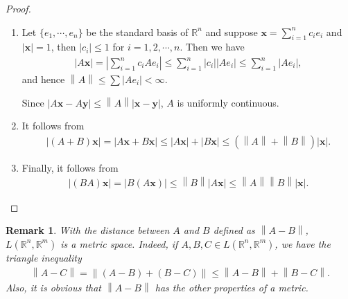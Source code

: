 \documentclass[10pt]{book}
\newtheorem{remark}{Remark}[chapter]
\theoremstyle{definition}
\numberwithin{equation}{chapter}
\begin{document}
\begin{proof}
~\begin{enumerate}[label=(\alph*)]
    \item Let $\{e_1, \cdots, e_n\}$ be the standard basis of $\mathbb{R}^n$ and suppose $\mathbf{x} = \sum^n_{i=1} c_i e_i$ and $\left|\mathbf{x}\right| = 1$, then $\left|c_i\right| \leq 1$ for $i = 1,2,\cdots,n$. Then we have
    \begin{align*}
        \left|A\mathbf{x}\right| = \left|\sum^n_{i=1} c_i Ae_i\right| \leq \sum^n_{i=1} \left|c_i\right| \left|A e_i\right| \leq \sum^n_{i=1} \left|A e_i\right|,
    \end{align*}
    and hence $\left\|A\right\| \leq \sum \left|A e_i\right| < \infty$. 
    
    Since $\left|A\mathbf{x} - A\mathbf{y}\right| \leq \left\|A\right\| \left|\mathbf{x} - \mathbf{y}\right|$, $A$ is uniformly continuous.
    
    \item It follows from
    \begin{align*}
        \left|(A+B)\mathbf{x}\right| = \left|A\mathbf{x} + B\mathbf{x}\right| \leq \left|A\mathbf{x}\right| + \left|B\mathbf{x}\right| \leq \left(\left\|A\right\| + \left\|B\right\|\right) \left|\mathbf{x}\right|.
    \end{align*}
    
    \item Finally, it follows from
    \begin{align*}
        \left|(BA)\mathbf{x}\right| = \left|B(A\mathbf{x})\right| \leq \left\|B\right\| \left|A\mathbf{x}\right| \leq \left\|A\right\| \left\|B\right\| \left|\mathbf{x}\right|.
    \end{align*}
\end{enumerate}
\end{proof}

\begin{remark}
With the distance between $A$ and $B$ defined as $\left\|A - B\right\|$, $L(\mathbb{R}^n,\mathbb{R}^m)$ is a metric space. Indeed, if $A, B, C \in L(\mathbb{R}^n,\mathbb{R}^m)$, we have the triangle inequality
\begin{align*}
    \left\|A - C\right\| = \left\|(A - B) + (B - C)\right\| \leq \left\|A - B\right\| + \left\|B - C\right\|.
\end{align*}
Also, it is obvious that $\left\|A - B\right\|$ has the other properties of a metric.
\end{remark}

\medskip
\end{document}
